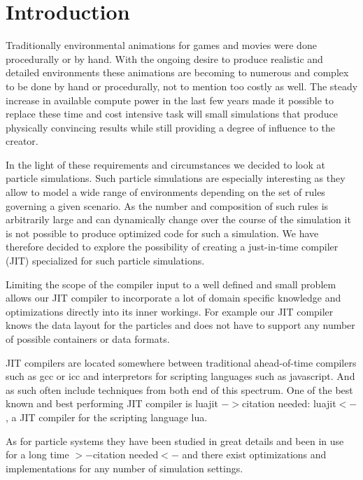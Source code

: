 \section{Introduction}\label{sec:intro}

Traditionally environmental animations for games and movies were done procedurally or by hand. With the ongoing desire to produce realistic and detailed environments these animations are becoming to numerous and complex to be done by hand or procedurally, not to mention too costly as well. The steady increase in available compute power in the last few years made it possible to replace these time and cost intensive task will small simulations that produce physically convincing results while still providing a degree of influence to the creator. 

In the light of these requirements and circumstances we decided to look at particle simulations. Such particle simulations are especially interesting as they allow to model a wide range of environments depending on the set of rules governing a given scenario. As the number and composition of such rules is arbitrarily large and can dynamically change over the course of the simulation it is not possible to produce optimized code for such a simulation. We have therefore decided to explore the possibility of creating a just-in-time compiler (JIT) specialized for such particle simulations.

Limiting the scope of the compiler input to a well defined and small problem allows our JIT compiler to incorporate a lot of domain specific knowledge and optimizations directly into its inner workings. For example our JIT compiler knows the data layout for the particles and does not have to support any number of possible containers or data formats. 

JIT compilers are located somewhere between traditional ahead-of-time compilers such as gcc or icc and interpretors for scripting languages such as javascript. And as such often include techniques from both end of this spectrum. One of the best known and best performing JIT compiler is luajit $->$citation needed: luajit$<-$, a JIT compiler for the scripting language lua.

As for particle systems they have been studied in great details and been in use for a long time $>-$citation needed$<-$ and there exist optimizations and implementations for any number of simulation settings.